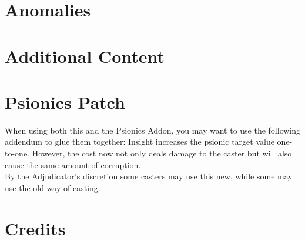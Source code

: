 \documentclass[11pt,a4paper,openany]{book}
\begin{document}
	\chapter{Anomalies}
	
	
	\chapter{Additional Content}
	
	
	\chapter{Psionics Patch}
	When using both this and the Psionics Addon, you may want to use the following addendum to glue them together: 
	Insight increases the psionic target value one-to-one. However, the cost now not only deals damage to the caster but will also cause the same amount of corruption.\\
	By the Adjudicator's discretion some casters may use this new, while some may use the old way of casting.
	
	\chapter{Credits}
	

\end{document}
